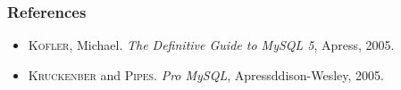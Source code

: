 \documentclass{beamer}
\begin{document}


\begin{frame} 
\frametitle{References}

\begin{itemize}
\item \textsc{Kofler}, Michael. \textit{The Definitive Guide to MySQL 5}, Apress, 2005.
\item \textsc{Kruckenber} and \textsc{Pipes}. \textit{Pro MySQL}, Apressddison-Wesley, 2005.
\end{itemize}

\end{frame}

\end{document}
